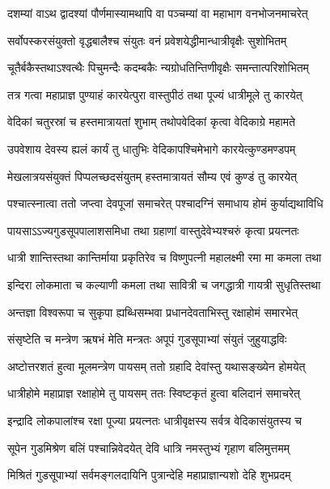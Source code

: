 \twolineshloka
{दशम्यां वाऽथ द्वादश्यां पौर्णमास्यामथापि वा}
{पञ्चम्यां वा महाभाग वनभोजनमाचरेत्} %

\twolineshloka
{सर्वोपस्करसंयुक्तो वृद्धबालैश्च संयुतः}
{वनं प्रवेशयेद्धीमान्धात्रीवृक्षैः सुशोभितम्} %

\twolineshloka
{चूतैर्बकैस्तथाऽश्वत्थैः पिचुमन्दैः कदम्बकैः}
{न्यग्रोधतिन्तिणीवृक्षैः समन्तात्परिशोभितम्} %

\twolineshloka
{तत्र गत्वा महाप्राज्ञ पुण्याहं कारयेत्पुरा}
{वास्तुपीठं तथा पूज्यं धात्रीमूले तु कारयेत्} %

\twolineshloka
{वेदिकां चतुरस्रां च हस्तमात्रायतां शुभाम्}
{तथोपवेदिकां कृत्वा वेदिकाग्रे महामते} %

\twolineshloka
{उपवेशाय देवस्य ह्यलं कार्यं तु धातुभिः}
{वेदिकापश्चिमेभागे कारयेत्कुण्डमण्डपम्} %

\twolineshloka
{मेखलात्रयसंयुक्तं पिप्पलच्छदसंयुतम्}
{हस्तमात्रायतं सौम्य एवं कुण्डं तु कारयेत्} %

\twolineshloka
{पश्चात्स्नात्वा ततो जप्त्वा देवपूजां समाचरेत्}
{पश्चादग्निं समाधाय होमं कुर्याद्यथाविधि} %

\twolineshloka
{पायसाऽऽज्यगुडसूपपालाशसमिधा तथा}
{ग्रहाणां वास्तुदेवेभ्यश्चरुं कृत्वा प्रयत्नतः} %

\twolineshloka
{धात्री शान्तिस्तथा कान्तिर्माया प्रकृतिरेव च}
{विष्णुपत्नी महालक्ष्मी रमा मा कमला तथा} %

\twolineshloka
{इन्दिरा लोकमाता च कल्याणी कमला तथा}
{सावित्री च जगद्धात्री गायत्री सुधृतिस्तथा} %

\twolineshloka
{अन्तज्ञा विश्वरूपा च सुकृपा ह्यब्धिसम्भवा}
{प्रधानदेवताभिस्तु रक्षाहोमं समारभेत्} %

\twolineshloka
{संसृष्टेति च मन्त्रेण ऋषभं मेति मन्त्रतः}
{अपूपं गुडसूपाभ्यां संयुतं जुहुयाद्धविः} %

\twolineshloka
{अष्टोत्तरशतं हुत्वा मूलमन्त्रेण पायसम्}
{ततो ग्रहादि देवांस्तु यथासङ्ख्येन होमयेत्} %

\twolineshloka
{धात्रीहोमे महाप्राज्ञ रक्षाहोमे तु पायसम्}
{ततः स्विष्टकृतं हुत्वा बलिदानं समाचरेत्} %

\twolineshloka
{इन्द्रादि लोकपालांश्च रक्षा पूज्या प्रयत्नतः}
{धात्रीवृक्षस्य सर्वत्र वेदिकासंयुतस्य च} %

\twolineshloka
{सूपेन गुडमिश्रेण बलिं पश्चान्निवेदयेत्}
{देवि धात्रि नमस्तुभ्यं गृहाण बलिमुत्तमम्} %

\twolineshloka
{मिश्रितं गुडसूपाभ्यां सर्वमङ्गलदायिनि}
{पुत्रान्देहि महाप्राज्ञान्यशो देहि शुभप्रदम्} %


